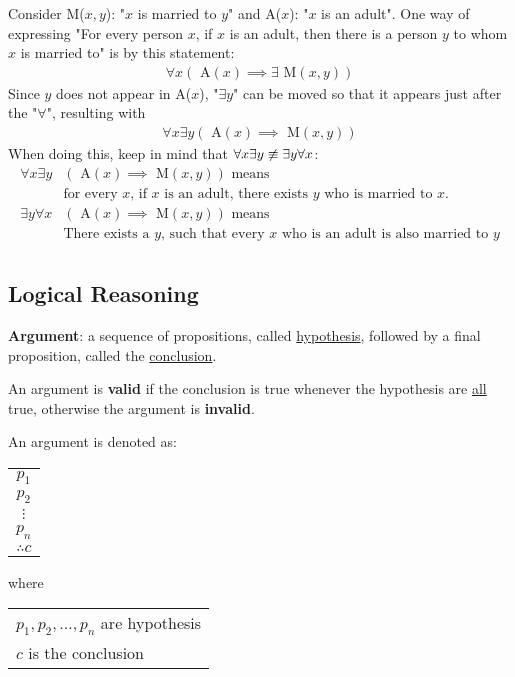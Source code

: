 Consider M($x, y$): "$x$ is married to $y$" and A($x$): "$x$ is an adult".
One way of expressing "For every person $x$, if $x$ is an adult, then
there is a person $y$ to whom $x$ is married to" is by this statement:
\begin{align*}
  \forall x (\text{ A}(x) \implies \exists \text{ M}(x, y))
\end{align*}
Since $y$ does not appear in A($x$), "$\exists y$" can be moved so that it appears
just after the "$\forall$", resulting with
\begin{align*}
  \forall x \exists y (\text{ A}(x) \implies \text{ M}(x, y))
\end{align*}
When doing this, keep in mind that $\forall x \exists y \centernot \equiv \exists y \forall x$:
\begin{align*}
  \forall x \exists y & (\text{ A}(x) \implies \text{ M}(x, y)) \text{ means}                                 \\
                      & \text{for every $x$, if $x$ is an adult, there exists $y$ who is married to $x$.}     \\
  \exists y \forall x & (\text{ A}(x) \implies \text{ M}(x, y)) \text{ means}                                 \\
                      & \text{There exists a $y$, such that every $x$ who is an adult is also married to $y$} \\
\end{align*}

\subsection{Logical Reasoning}

\textbf{Argument}: a sequence of propositions, called \underline{hypothesis}, followed
by a final proposition, called the \underline{conclusion}.

An argument is \textbf{valid} if the conclusion is true whenever the hypothesis
are \underline{all} true, otherwise the argument is \textbf{invalid}.

\begin{center}
  An argument is denoted as:
  \begin{tabular}{c}
    $p_1$     \\
    $p_2$     \\
    $\vdots $ \\
    $p_n$     \\
    \hline
    $\therefore c$
  \end{tabular}
  where
  \begin{tabular}{l}
    $p_1, p_2, \ldots, p_n$ are hypothesis \\
    $c$ is the conclusion
  \end{tabular}
\end{center}

